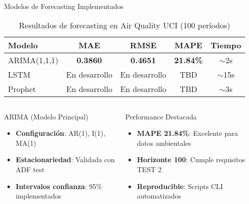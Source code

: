 \documentclass[aspectratio=169]{beamer}
\begin{document}
\begin{frame}{Modelos de Forecasting Implementados}
    \begin{table}
        \centering
        \begin{tabular}{lcccc}
            \toprule
            \textbf{Modelo} & \textbf{MAE} & \textbf{RMSE} & \textbf{MAPE} & \textbf{Tiempo} \\
            \midrule
            ARIMA(1,1,1) & \textbf{0.3860} & \textbf{0.4651} & \textbf{21.84\%} & $\sim$2s \\
            LSTM & En desarrollo & En desarrollo & TBD & $\sim$15s \\
            Prophet & En desarrollo & En desarrollo & TBD & $\sim$3s \\
            \bottomrule
        \end{tabular}
        \caption{Resultados de forecasting en Air Quality UCI (100 períodos)}
    \end{table}
    
    \vspace{0.5cm}
    
    \begin{columns}[T]
        \begin{column}{0.48\textwidth}
            \begin{block}{ARIMA (Modelo Principal)}
                \begin{itemize}
                    \item \textbf{Configuración}: AR(1), I(1), MA(1)
                    \item \textbf{Estacionariedad}: Validada con ADF test
                    \item \textbf{Intervalos confianza}: 95\% implementados
                \end{itemize}
            \end{block}
        \end{column}
        
        \begin{column}{0.48\textwidth}
            \begin{alertblock}{Performance Destacada}
                \begin{itemize}
                    \item \textbf{MAPE 21.84\%}: Excelente para datos ambientales
                    \item \textbf{Horizonte 100}: Cumple requisitos TEST 2
                    \item \textbf{Reproducible}: Scripts CLI automatizados
                \end{itemize}
            \end{alertblock}
        \end{column}
    \end{columns}
\end{frame}
\end{document}
